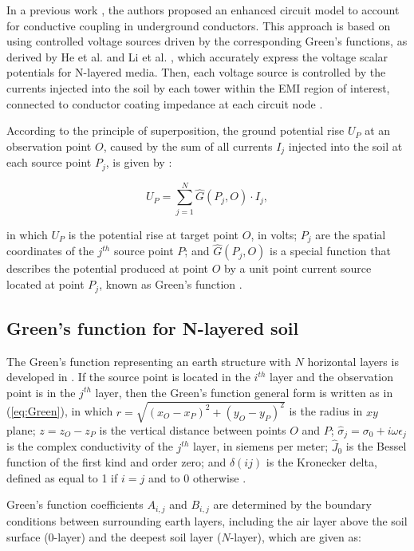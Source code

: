 \documentclass{IEEEtran4PSCC}
\begin{document}
In a previous work \cite{Martins-Britto2020}, the authors proposed an enhanced circuit model to account for conductive coupling in underground conductors. This approach is based on using controlled voltage sources driven by the corresponding Green's functions, as derived by He et al. \cite{He2012} and Li et al. \cite{Li2006}, which accurately express the voltage scalar potentials for N-layered media. Then, each voltage source is controlled by the currents injected into the soil by each tower within the EMI region of interest, connected to conductor coating impedance at each circuit node \cite{Martins-Britto2020}.

According to the principle of superposition, the ground potential rise $U_{P}$ at an observation point $O$, caused by the sum of all currents $I_j$ injected into the soil at each source point $P_{j}$, is given by \cite{Li2006}:

\begin{equation}
	U_{P} = \sum_{j=1}^{N} \hat{G}(P_{j},O)\cdot I_{j},
\end{equation} 

\noindent in which $U_{P}$ is the potential rise at target point $O$, in volts; $P_{j}$ are the spatial coordinates of the $j^{th}$ source point $P$; and $\hat{G}(P_{j},O)$ is a special function that describes the potential produced at point $O$ by a unit point current source located at point $P_{j}$, known as Green's function \cite{Li2006,Martins-Britto2020}.

\subsection{Green's function for N-layered soil}

The Green's function representing an earth structure with $N$ horizontal layers is developed in \cite{He2012,Li2006}. If the source point is located in the $i^{th}$ layer and the observation point is in the $j^{th}$ layer, then the Green's function general form is written as in (\ref{eq:Green}), in which $r = \sqrt{(x_{O} - x_{P})^{2} + (y_{O} - y_{P})^{2}}$ is the radius in $xy$ plane; $z = z_{O} - z_{P}$ is the vertical distance between points $O$ and $P$; $\hat\sigma_{j} = \sigma_{0} + i\omega\epsilon_{j}$ is the complex conductivity of the $j^{th}$ layer, in siemens per meter; $\hat{J}_{0}$ is the Bessel function of the first kind and order zero; and $\delta(ij)$ is the Kronecker delta, defined as equal to 1 if $i=j$ and to 0 otherwise \cite{Li2006}.

Green's function coefficients $A_{i,j}$ and $B_{i,j}$ are determined by the boundary conditions between surrounding earth layers, including the air layer above the soil surface (0-layer) and the deepest soil layer ($N$-layer), which are given as:
\end{document}
